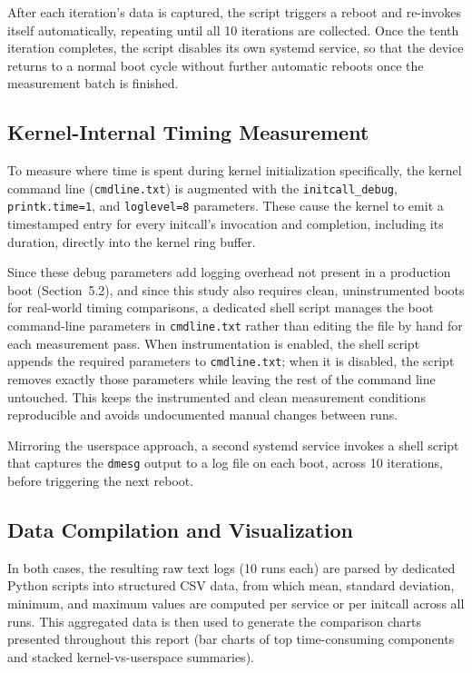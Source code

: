 \documentclass[11pt,a4paper]{article}
\begin{document}
After each iteration's data is captured, the script triggers a reboot and re-invokes itself automatically, repeating until all 10 iterations are collected. Once the tenth iteration completes, the script disables its own systemd service, so that the device returns to a normal boot cycle without further automatic reboots once the measurement batch is finished.

\subsection{Kernel-Internal Timing Measurement}

To measure where time is spent during kernel initialization specifically, the kernel command line (\texttt{cmdline.txt}) is augmented with the \texttt{initcall\_debug}, \texttt{printk.time=1}, and \texttt{loglevel=8} parameters. These cause the kernel to emit a timestamped entry for every initcall's invocation and completion, including its duration, directly into the kernel ring buffer.

Since these debug parameters add logging overhead not present in a production boot (Section~5.2), and since this study also requires clean, uninstrumented boots for real-world timing comparisons, a dedicated shell script manages the boot command-line parameters in \texttt{cmdline.txt} rather than editing the file by hand for each measurement pass. When instrumentation is enabled, the shell script appends the required parameters to \texttt{cmdline.txt}; when it is disabled, the script removes exactly those parameters while leaving the rest of the command line untouched. This keeps the instrumented and clean measurement conditions reproducible and avoids undocumented manual changes between runs.

Mirroring the userspace approach, a second systemd service invokes a shell script that captures the \texttt{dmesg} output to a log file on each boot, across 10 iterations, before triggering the next reboot.

\subsection{Data Compilation and Visualization}

In both cases, the resulting raw text logs (10 runs each) are parsed by dedicated Python scripts into structured CSV data, from which mean, standard deviation, minimum, and maximum values are computed per service or per initcall across all runs. This aggregated data is then used to generate the comparison charts presented throughout this report (bar charts of top time-consuming components and stacked kernel-vs-userspace summaries).
\end{document}
